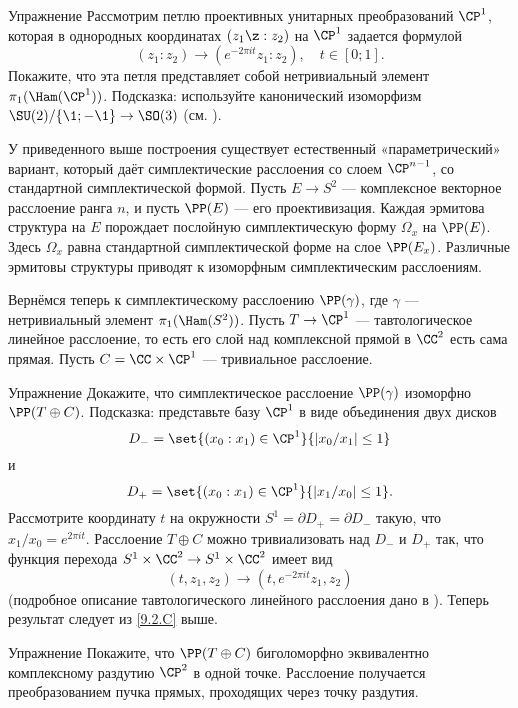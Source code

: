 \begin{thm}{Упражнение}\label{9.2.C}
Рассмотрим петлю проективных унитарных преобразований $\CP^1$, которая в однородных координатах $(z_1 \z: z_2)$ на $\CP^1$ задается формулой 
\[(z_1 : z_2 ) \to (e^{-2\pi it} z_1 : z_2 ),\quad t \in [0; 1].\]
Покажите, что эта петля представляет собой нетривиальный элемент $\pi_1 (\Ham(\CP^1 ))$.
Подсказка: используйте канонический изоморфизм $\SU (2)/\{\1; -\1\} \to \SO(3)$ (см. \cite{DFN}).
\end{thm}

У приведенного выше построения существует естественный «параметрический» вариант, который даёт симплектические расслоения со слоем $\CP^{n-1}$, со стандартной симплектической формой.
Пусть $E \to S^2$ --- комплексное векторное расслоение ранга $n$, и пусть $\PP(E)$ --- его проективизация.
Каждая эрмитова структура на $E$ порождает послойную симплектическую форму $\Omega_x$ на $\PP(E)$.
Здесь $\Omega_x$ равна стандартной симплектической форме на слое $\PP(E_x)$.
Различные эрмитовы структуры приводят к изоморфным симплектическим расслоениям.

Вернёмся теперь к симплектическому расслоению $\PP(\gamma)$, где $\gamma$ --- нетривиальный элемент $\pi_1 (\Ham(S^2 ))$.
Пусть $T \to \CP^1$ --- тавтологическое линейное расслоение,
то есть его слой над комплексной прямой в $\CC^2$ есть сама прямая.
Пусть $C = \CC \times \CP^1$ --- тривиальное расслоение.

\begin{thm}{Упражнение}\label{9.2.D}
Докажите, что симплектическое расслоение $\PP(\gamma)$ изоморфно $\PP(T \oplus C)$.
Подсказка: представьте базу $\CP^1$ в виде объединения двух дисков 
\[D_- = \set{(x_0 : x_1 ) \in \CP^1}{ |x_0 /x_1 | \le 1}\]
и
\[D_+ = \set{(x_0 : x_1 ) \in \CP^1}{|x_1 /x_0 | \le 1}.\]
Рассмотрите координату $t$ на окружности $S^1 = \partial D_+ = \partial D_-$ такую, что $x_1 /x_0 = e^{2\pi it}$.
Расслоение $T \oplus C$ можно тривиализовать над $D_-$ и $D_+$ так, что функция перехода $S^1 \times \CC^2 \to S^1 \times \CC^2$ имеет вид 
\[(t, z_1, z_2 ) \to (t, e^{-2\pi it} z_1, z_2 )\]
(подробное описание тавтологического линейного расслоения дано в \cite{GH}).
Теперь результат следует из \ref{9.2.C} выше.
\end{thm}

\begin{thm}{Упражнение}\label{9.2.E}
Покажите, что $\PP(T \oplus C)$ биголоморфно эквивалентно комплексному раздутию $\CP^2$ в одной точке.
Расслоение получается  преобразованием пучка прямых, проходящих через точку раздутия.
\end{thm}
